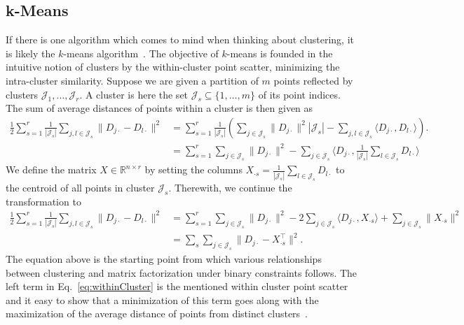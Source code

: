\subsection{k-Means}\label{sec:ZS:kmeans}
If there is one algorithm which comes to mind when thinking about clustering, it is likely the $k$-means algorithm~\citep{lloyd1982least}. The objective of $k$-means is founded in the intuitive notion of clusters by the within-cluster point scatter, minimizing the intra-cluster similarity.
Suppose we are given a partition of $m$ points reflected by clusters $\mathcal{J}_1,\ldots, \mathcal{J}_r$. A cluster is here the set $\mathcal{J}_s\subseteq \{1,\ldots, m\}$ of its point indices. The sum of average distances of points within a cluster is then given as
\begin{align*}
\frac{1}{2}\sum_{s=1}^r\frac{1}{|\mathcal{J}_s|}\sum_{j,l\in \mathcal{J}_s} \|D_{j\cdot}-D_{l\cdot}\|^2 
&= \sum_{s=1}^r \frac{1}{|\mathcal{J}_s|}\left(\sum_{j\in \mathcal{J}_s} \|D_{j\cdot}\|^2|\mathcal{J}_s| - \sum_{j,l\in \mathcal{J}_s}\langle D_{j\cdot},D_{l\cdot}\rangle\right).\\
&= \sum_{s=1}^r \sum_{j\in \mathcal{J}_s} \|D_{j\cdot }\|^2 -\sum_{j\in \mathcal{J}_s}\Big\langle D_{j\cdot},\frac{1}{|\mathcal{J}_s|}\sum_{l\in\mathcal{J}_s}D_{l\cdot}\Big\rangle
\end{align*}
We define the matrix $X\in\mathbb{R}^{n\times r}$ by setting the columns $X_{\cdot s}=\frac{1}{|\mathcal{J}_s|}\sum_{l\in\mathcal{J}_s}D_{l\cdot}$ to the centroid of all points in cluster $\mathcal{J}_s$. Therewith, we continue the transformation to
\begin{align}
\frac{1}{2}\sum_{s=1}^r\frac{1}{|\mathcal{J}_s|}\sum_{j,l\in \mathcal{J}_s} \|D_{j\cdot}-D_{l\cdot}\|^2 
&= \sum_{s=1}^r \sum_{j\in \mathcal{J}_s} \|D_{j\cdot }\|^2 -2\sum_{j\in \mathcal{J}_s}\langle D_{j\cdot},X_{\cdot s}\rangle +\sum_{j\in \mathcal{J}_s}\|X_{\cdot s}\|^2 \label{eq:withinCluster}\\
&= \sum_s \sum_{j\in \mathcal{J}_s} \|D_{j\cdot} -X_{\cdot s}^\top\|^2.\nonumber
\end{align}
The equation above is the starting point from which various relationships between clustering and matrix factorization under binary constraints follows. The left term in Eq.~\eqref{eq:withinCluster} is the mentioned within cluster point scatter and it easy to show that a minimization of this term goes along with the maximization of the average distance of points from distinct clusters~\citep{friedman2001elements}. 

